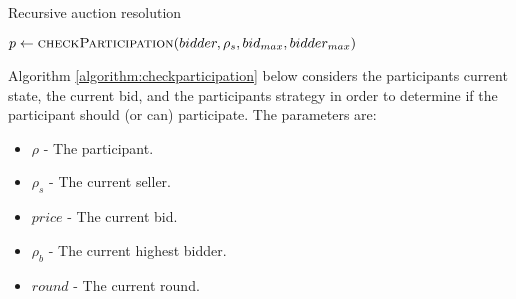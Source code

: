 \begin{algorithm}[H]
\caption{Recursive auction resolution}
\label{algorithm:auction}
\begin{algorithmic}[1]
        \State \Return
    \EndIf
        \EndIf
    \EndFor
        \State $p \gets \textsc{checkParticipation}(bidder, \rho_s, bid_{max}, bidder_{max})$ 
        \EndIf
    \EndFor
\EndProcedure
\end{algorithmic}
\end{algorithm}

Algorithm \ref{algorithm:checkparticipation} below considers the participants current state, the current bid, and the participants strategy in order to determine if the participant should (or can) participate. The parameters are:

\begin{itemize}
    \item $\rho$ - The participant.
    \item $\rho_s$ - The current seller.
    \item $price$ - The current bid.
    \item $\rho_b$ - The current highest bidder.
    \item $round$ - The current round.
\end{itemize}

